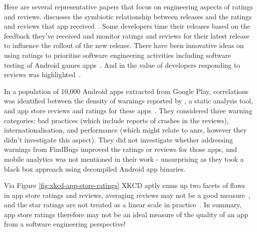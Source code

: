 Here are several representative papers that focus on engineering aspects of ratings and reviews.  \citeauthor{alsubaihin2019app_store_effects_on_software_engineering} discusses the symbiotic relationship between releases and the ratings and reviews that app received~. Some developers time their releases based on the feedback they've received and monitor ratings and reviews for their latest release to influence the rollout of the new release. There have been innovative ideas on using ratings to prioritise software engineering activities including software testing of Android games apps~. And in \citeauthor{greenheld2018_automating_developers_responses_to_app_reviews} the value of developers responding to reviews was highlighted~. 

In a population of 10,000 Android apps extracted from Google Play, correlations was identified between the density of warnings reported by , a static analysis tool, and app store reviews and ratings for these apps~. They considered three warning categories: bad practices (which include reports of crashes in the reviews), internationalisation, and performance (which might relate to \Glspl{anr}, however they didn't investigate this aspect). They did not investigate whether addressing warnings from FindBugs improved the ratings or reviews for those apps, and mobile analytics was not mentioned in their work - unsurprising as they took a black box approach using decompiled Android app binaries.

Via Figure \ref{fig:xkcd-app-store-ratings} XKCD aptly sums up two facets of flaws in app store ratings and reviews, averaging reviews may not be a good measure~, and the star ratings are not treated as a linear scale in practice~. In summary, app store ratings therefore may not be an ideal measure of the quality of an app from a software engineering perspective!

\FloatBarrier

